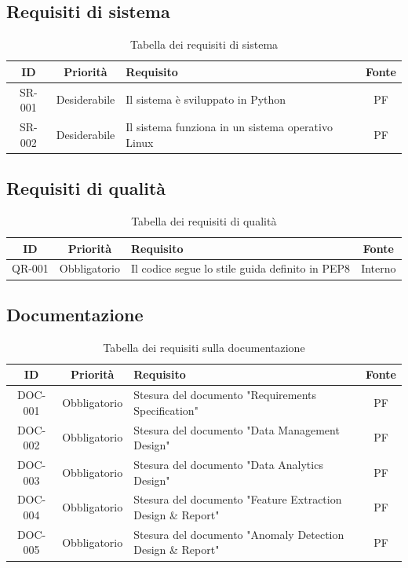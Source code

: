 \subsection{Requisiti di sistema}
\begin{table} [H]
	\centering
	\begin{tabularx}{\textwidth}{|c c X c|} 
		\hline
		ID & Priorità & Requisito & Fonte \\ [0.5ex] 
		\hline\hline
		SR-001 & Desiderabile & Il sistema è sviluppato in Python & PF \\ 
		\hline
		SR-002 & Desiderabile & Il sistema funziona in un sistema operativo Linux & PF \\ 
		\hline
		
	\end{tabularx}
	\caption{Tabella dei requisiti di sistema}
\end{table}

\subsection{Requisiti di qualità}
\begin{table} [H]
	\centering
	\begin{tabularx}{\textwidth}{|c c X c|} 
		\hline
		ID & Priorità & Requisito & Fonte \\ [0.5ex] 
		\hline\hline
		QR-001 & Obbligatorio & Il codice segue lo stile guida definito in PEP8 & Interno \\ 
		\hline
		
	\end{tabularx}
	\caption{Tabella dei requisiti di qualità}
\end{table}

\subsection{Documentazione}
\begin{table} [H]
	\centering
	\begin{tabularx}{\textwidth}{|c c X c|} 
		\hline
		ID & Priorità & Requisito & Fonte \\ [0.5ex] 
		\hline\hline
		DOC-001 & Obbligatorio & Stesura del documento "Requirements Specification" & PF \\ 
		\hline
		DOC-002 & Obbligatorio & Stesura del documento "Data Management Design" & PF \\ 
		\hline
		DOC-003 & Obbligatorio & Stesura del documento "Data Analytics Design" & PF \\ 
		\hline
		DOC-004 & Obbligatorio & Stesura del documento "Feature Extraction Design \& Report" & PF \\ 
		\hline
		DOC-005 & Obbligatorio & Stesura del documento "Anomaly Detection Design \& Report" & PF \\ 
		\hline
	\end{tabularx}
	\caption{Tabella dei requisiti sulla documentazione}
\end{table}

